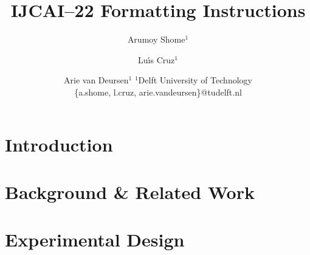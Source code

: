 \documentclass{article}
\title{IJCAI--22 Formatting Instructions}
\author{
  Arumoy Shome$^1$
  \and
  Lu{\'\i}s Cruz$^1$\and
  Arie van Deursen$^{1}$
  \affiliations
  $^1$Delft University of Technology\\
  \emails
  \{a.shome, l.cruz, arie.vandeursen\}@tudelft.nl
}
\begin{document}
\maketitle

\begin{abstract}
\end{abstract}

\section{Introduction}\label{sec:intro}






\section{Background \& Related Work}\label{sec:related}





\section{Experimental Design}\label{sec:method}
\end{document}
